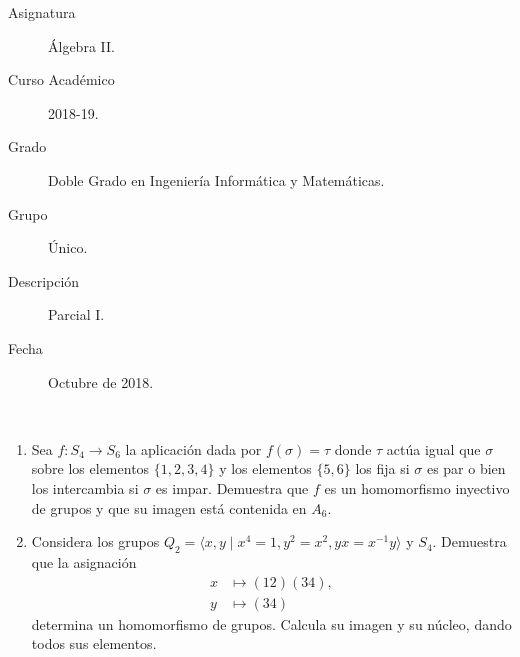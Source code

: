 \documentclass[12pt]{article}
\begin{document}

    
    

    \begin{description}
        \item[Asignatura] Álgebra II.
        \item[Curso Académico] 2018-19.
        \item[Grado] Doble Grado en Ingeniería Informática y Matemáticas.
        \item[Grupo] Único.
        \item[Descripción] Parcial I.
        \item[Fecha] Octubre de 2018.
    
    \end{description}
    \newpage

    \begin{ejercicio}~
        \begin{enumerate}
            \item Sea $f: S_4 \to S_6$ la aplicación dada por $f(\sigma) = \tau$ donde $\tau$ actúa igual que $\sigma$ sobre los elementos $\{1, 2, 3, 4\}$ y los elementos $\{5, 6\}$ los fija si $\sigma$ es par o bien los intercambia si $\sigma$ es impar. Demuestra que $f$ es un homomorfismo inyectivo de grupos y que su imagen está contenida en $A_6$.
            \item Considera los grupos $Q_2 = \langle x, y \mid x^4 = 1, y^2 = x^2, yx = x^{-1}y \rangle$ y $S_4$. Demuestra que la asignación
            \begin{align*}
                x &\mapsto (12)(34),\\
                y &\mapsto (34)
            \end{align*}
            determina un homomorfismo de grupos. Calcula su imagen y su núcleo, dando todos sus elementos.
        \end{enumerate}
    \end{ejercicio}
\end{document}
